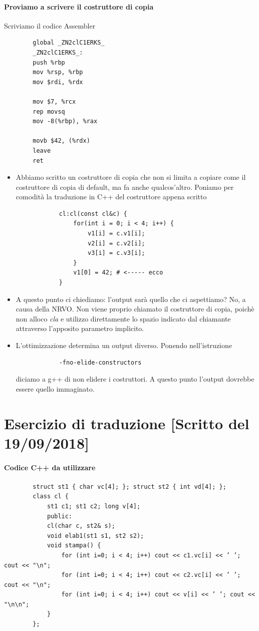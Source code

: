 	\paragraph{Proviamo a scrivere il costruttore di copia} Scriviamo il codice Assembler
	\begin{verbatim}
		global _ZN2clC1ERKS_
		_ZN2clC1ERKS_:
		push %rbp
		mov %rsp, %rbp
		mov $rdi, %rdx
		
		mov $7, %rcx
		rep movsq
		mov -8(%rbp), %rax
		
		movb $42, (%rdx)
		leave
		ret
	\end{verbatim}
	\begin{itemize}
		\item Abbiamo scritto un costruttore di copia che non si limita a copiare come il costruttore di copia di default, ma fa anche qualcos'altro. Poniamo per comodità la traduzione in C++ del costruttore appena scritto
		\begin{verbatim}
			cl:cl(const cl&c) {
				for(int i = 0; i < 4; i++) {
					v1[i] = c.v1[i];
					v2[i] = c.v2[i];
					v3[i] = c.v3[i];
				}
				v1[0] = 42; # <----- ecco
			}
		\end{verbatim}
		\item A questo punto ci chiediamo: l'output sarà quello che ci aspettiamo? No, a causa della NRVO. Non viene proprio chiamato il costruttore di copia, poichè non alloco \emph{cla} e utilizzo direttamente lo spazio indicato dal chiamante attraverso l'apposito parametro implicito. 
		\item L'ottimizzazione determina un output diverso. Ponendo nell'istruzione
		\begin{verbatim}
			-fno-elide-constructors
		\end{verbatim}
		diciamo a g++ di non elidere i costruttori. A questo punto l'output dovrebbe essere quello immaginato.
	\end{itemize}
	\endgroup
	
	\section{Esercizio di traduzione [Scritto del 19/09/2018]}
	\begingroup
	\small
	\paragraph{Codice C++ da utilizzare}
	\begin{verbatim}
		struct st1 { char vc[4]; }; struct st2 { int vd[4]; };
		class cl {
			st1 c1; st1 c2; long v[4];
			public:
			cl(char c, st2& s);
			void elab1(st1 s1, st2 s2);
			void stampa() {
				for (int i=0; i < 4; i++) cout << c1.vc[i] << ’ ’; cout << "\n";
				for (int i=0; i < 4; i++) cout << c2.vc[i] << ’ ’; cout << "\n";
				for (int i=0; i < 4; i++) cout << v[i] << ’ ’; cout << "\n\n";
			}
		};
	\end{verbatim}
